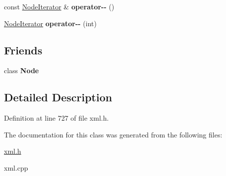\begin{DoxyCompactItemize}
\item 
\hypertarget{classphys_1_1xml_1_1NodeIterator_a9d0ace0a01c3ea0a0ff2ed389b4a5141}{
const \hyperlink{classphys_1_1xml_1_1NodeIterator}{NodeIterator} \& {\bfseries operator-\/-\/} ()}
\label{da/d4f/classphys_1_1xml_1_1NodeIterator_a9d0ace0a01c3ea0a0ff2ed389b4a5141}

\item 
\hypertarget{classphys_1_1xml_1_1NodeIterator_a4775254b1fbfc2e10a6024241be55f6a}{
\hyperlink{classphys_1_1xml_1_1NodeIterator}{NodeIterator} {\bfseries operator-\/-\/} (int)}
\label{da/d4f/classphys_1_1xml_1_1NodeIterator_a4775254b1fbfc2e10a6024241be55f6a}

\end{DoxyCompactItemize}
\subsection*{Friends}
\begin{DoxyCompactItemize}
\item 
\hypertarget{classphys_1_1xml_1_1NodeIterator_a6db9d28bd448a131448276ee03de1e6d}{
class {\bfseries Node}}
\label{da/d4f/classphys_1_1xml_1_1NodeIterator_a6db9d28bd448a131448276ee03de1e6d}

\end{DoxyCompactItemize}


\subsection{Detailed Description}


Definition at line 727 of file xml.h.



The documentation for this class was generated from the following files:\begin{DoxyCompactItemize}
\item 
\hyperlink{xml_8h}{xml.h}\item 
xml.cpp\end{DoxyCompactItemize}
